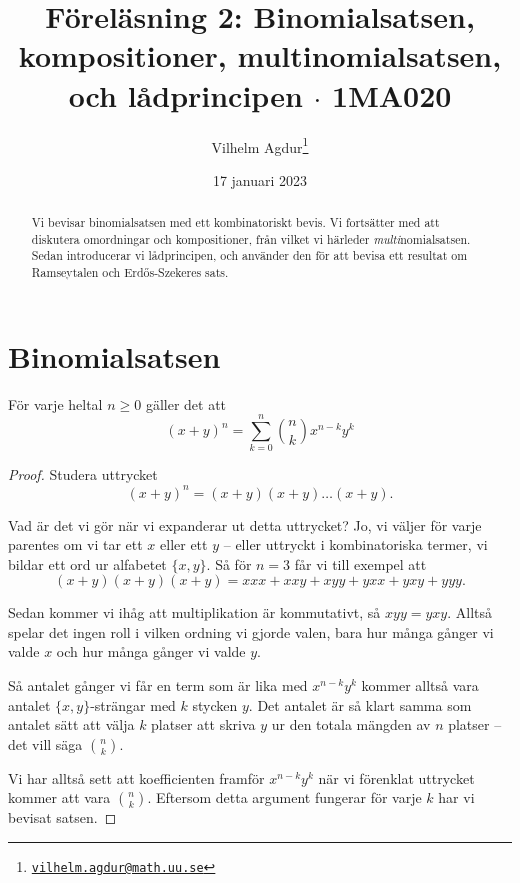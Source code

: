\documentclass[nobib]{tufte-handout}
\title{Föreläsning 2: Binomialsatsen, kompositioner, multinomialsatsen, och lådprincipen $\cdot$ 1MA020}
\author[Vilhelm Agdur]{Vilhelm Agdur\thanks{\href{mailto:vilhelm.agdur@math.uu.se}{\nolinkurl{vilhelm.agdur@math.uu.se}}}}
\date{17 januari 2023}
\begin{document}
\maketitle%

\begin{abstract}
\noindent
Vi bevisar binomialsatsen med ett kombinatoriskt bevis. Vi fortsätter med att diskutera omordningar och kompositioner, från vilket vi härleder \emph{multi}nomialsatsen. Sedan introducerar vi lådprincipen, och använder den för att bevisa ett resultat om Ramseytalen och Erd\H{o}s-Szekeres sats.
\end{abstract}

\section{Binomialsatsen}

\begin{theorem}[Binomialsatsen]
  För varje heltal $n\geq 0$ gäller det att
  $$(x + y)^n = \sum_{k=0}^n \binom{n}{k}x^{n-k}y^k$$
  \begin{proof}
    Studera uttrycket
    $$(x + y)^n = (x + y)(x + y)\ldots(x + y).$$

    Vad är det vi gör när vi expanderar ut detta uttrycket? Jo, vi väljer för varje parentes om vi tar ett $x$ eller ett $y$ -- eller uttryckt i kombinatoriska termer, vi bildar ett ord ur alfabetet $\{x, y\}$. Så för $n = 3$ får vi till exempel att
    $$(x+y)(x+y)(x+y) = xxx + xxy + xyy + yxx + yxy + yyy.$$

    Sedan kommer vi ihåg att multiplikation är kommutativt, så $xyy = yxy$. Alltså spelar det ingen roll i vilken ordning vi gjorde valen, bara hur många gånger vi valde $x$ och hur många gånger vi valde $y$.

    Så antalet gånger vi får en term som är lika med $x^{n-k}y^k$ kommer alltså vara antalet $\{x, y\}$-strängar med $k$ stycken $y$. Det antalet är så klart samma som antalet sätt att välja $k$ platser att skriva $y$ ur den totala mängden av $n$ platser -- det vill säga $\binom{n}{k}$.

    Vi har alltså sett att koefficienten framför $x^{n-k}y^k$ när vi förenklat uttrycket kommer att vara $\binom{n}{k}$. Eftersom detta argument fungerar för varje $k$ har vi bevisat satsen.
  \end{proof}
\end{theorem}
\end{document}
